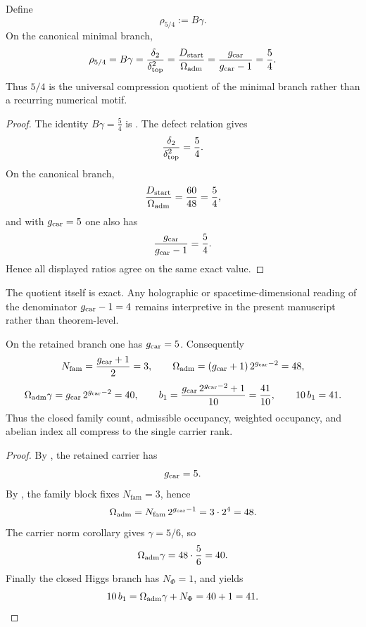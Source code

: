 \begin{lemma}
\label{lem:universal-5-4-compression}
Define
\[
\rho_{5/4}:=B\gamma.
\]
On the canonical minimal branch,
\[
\rho_{5/4}
=
B\gamma
=
\frac{\delta_2}{\delta_{\mathrm{top}}^2}
=
\frac{D_{\mathrm{start}}}{\Omega_{\mathrm{adm}}}
=
\frac{g_{\mathrm{car}}}{g_{\mathrm{car}}-1}
=
\frac54.
\]
Thus $5/4$ is the universal compression quotient of the minimal branch rather than a recurring numerical motif.
\end{lemma}

\begin{proof}
The identity $B\gamma=\frac54$ is . The defect relation gives
\[
\frac{\delta_2}{\delta_{\mathrm{top}}^2}=\frac54.
\]
On the canonical branch,
\[
\frac{D_{\mathrm{start}}}{\Omega_{\mathrm{adm}}}=\frac{60}{48}=\frac54,
\]
and with $g_{\mathrm{car}}=5$ one also has
\[
\frac{g_{\mathrm{car}}}{g_{\mathrm{car}}-1}=\frac{5}{4}.
\]
Hence all displayed ratios agree on the same exact value.
\end{proof}

\begin{remark}
The quotient itself is exact. Any holographic or spacetime-dimensional reading of the denominator $g_{\mathrm{car}}-1=4$ remains interpretive in the present manuscript rather than theorem-level.
\end{remark}

\begin{corollary}
\label{cor:rank-5-master-compression}
On the retained branch one has $g_{\mathrm{car}}=5$. Consequently
\[
N_{\mathrm{fam}}=\frac{g_{\mathrm{car}}+1}{2}=3,
\qquad
\Omega_{\mathrm{adm}}=(g_{\mathrm{car}}+1)\,2^{g_{\mathrm{car}}-2}=48,
\]
\[
\Omega_{\mathrm{adm}}\gamma=g_{\mathrm{car}}\,2^{g_{\mathrm{car}}-2}=40,
\qquad
b_1=\frac{g_{\mathrm{car}}\,2^{g_{\mathrm{car}}-2}+1}{10}=\frac{41}{10},
\qquad
10\,b_1=41.
\]
Thus the closed family count, admissible occupancy, weighted occupancy, and abelian index all
compress to the single carrier rank.
\end{corollary}

\begin{proof}
By , the retained carrier has
\[
g_{\mathrm{car}}=5.
\]
By , the family block fixes $N_{\mathrm{fam}}=3$, hence
\[
\Omega_{\mathrm{adm}}=N_{\mathrm{fam}}\,2^{g_{\mathrm{car}}-1}=3\cdot 2^4=48.
\]
The carrier norm corollary gives $\gamma=5/6$, so
\[
\Omega_{\mathrm{adm}}\gamma=48\cdot\frac56=40.
\]
Finally the closed Higgs branch has $N_\Phi=1$, and  yields
\[
10\,b_1=\Omega_{\mathrm{adm}}\gamma+N_\Phi=40+1=41.
\]
\end{proof}

